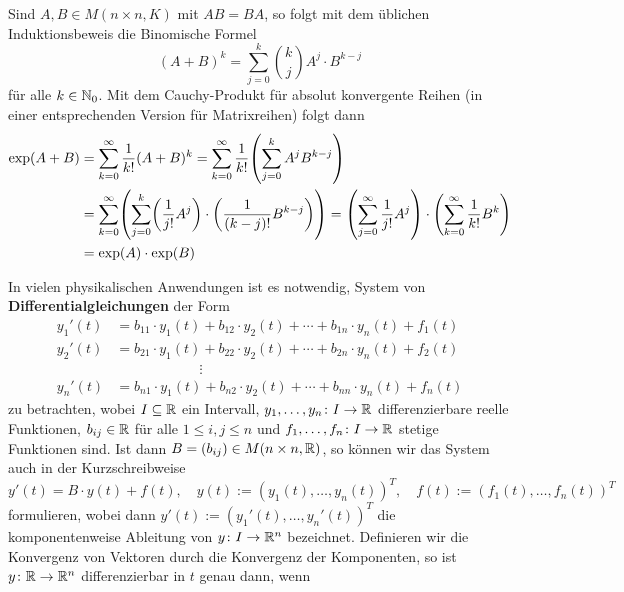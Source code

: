 \begin{beweis}[Skizze]
	Sind $A,B \in M(n \times n,K)$ mit $AB = BA$, so folgt mit dem üblichen Induktionsbeweis die Binomische Formel 
	\[
	(A+B)^{k} = \sum_{j=0}^{k} \binom{k}{j} A^{j} \cdot B^{k-j}
		\]
	für alle $k \in \mathbb{N}_0$.
	Mit dem Cauchy-Produkt für absolut konvergente Reihen (in einer entsprechenden Version für Matrixreihen) folgt dann
	\begin{align*}
	\exp(A+B) &= \sum_{k=0}^{\infty} \frac{1}{k!} (A+B)^k = \sum_{k=0}^{\infty} \frac{1}{k!} \enb{\sum_{j=0}^{k} A^{j} B^{k-j}} \\
	&= \sum_{k=0}^{\infty} \enb{\sum_{j=0}^{k} \enb{\frac{1}{j!} A^{j}} \cdot \enb{\frac{1}{(k-j)!} B^{k-j}}} = \enb{\sum_{j=0}^{\infty} \frac{1}{j!} A^{j}} \cdot \enb{\sum_{k=0}^{\infty} \frac{1}{k!} B^{k}} \\
	&= \exp(A) \cdot \exp(B) 
	\end{align*}
\end{beweis}

In vielen physikalischen Anwendungen ist es notwendig, System von \textbf{Differentialgleichungen} der Form 
\begin{align*}
	y_1'(t) &= b_{11} \cdot y_1(t) + b_{12} \cdot y_2(t) + \cdots + b_{1n} \cdot y_n(t) + f_1 (t) \\
	y_2'(t) &= b_{21} \cdot y_1(t) + b_{22} \cdot y_2(t) + \cdots + b_{2n} \cdot y_n(t) + f_2 (t)\\
	& \qquad \qquad \qquad \vdots \\
	y_n'(t) &= b_{n1} \cdot y_1(t) + b_{n2} \cdot y_2(t) + \cdots + b_{nn} \cdot y_n(t) + f_n(t)
\end{align*}
zu betrachten, wobei $I \subseteq \mathbb{R}$ ein Intervall, $y_1,\dots,y_n\colon I \rightarrow \mathbb{R}$ differenzierbare reelle Funktionen, $b_{ij} \in \mathbb{R}$ für alle $1 \leq i,j \leq n$ und $f_1,\dots,f_n \colon I \rightarrow \mathbb{R}$ stetige Funktionen sind.
Ist dann $B = (b_{ij}) \in M(n \times n, \mathbb{R})$, so können wir das System auch in der Kurzschreibweise
\[
	y'(t) = B \cdot y(t) + f(t), \quad y(t) := (y_1(t),\dots,y_n(t))^T, \quad f(t) := (f_1(t),\dots,f_n(t))^T
\]
formulieren, wobei dann $y'(t) := (y_1'(t),\dots,y_n'(t))^T$ die komponentenweise Ableitung von $y\colon I \rightarrow \mathbb{R}^n$ bezeichnet.
Definieren wir die Konvergenz von Vektoren durch die Konvergenz der Komponenten, so ist $y \colon \mathbb{R} \rightarrow \mathbb{R}^n$ differenzierbar in $t$ genau dann, wenn

